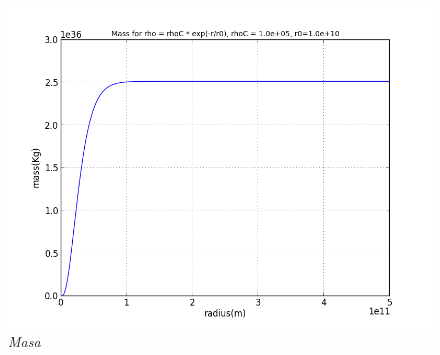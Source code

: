 \documentclass[12pt]{book}
\begin{document}
\begin{description}
\begin{figure}[!ht]
 \centering
 \includegraphics[scale=0.4]{massAn.png}
 \caption{\emph{Masa}}
\end{figure}


\end{description}
\end{document}
